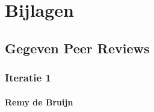 \documentclass[a4paper]{report}
\begin{document}


\endgroup

\chapter{Bijlagen}
\section{Gegeven Peer Reviews}
\subsection{Iteratie 1}
\subsubsection{Remy de Bruijn}
\noindent
\begin{minipage}{\textwidth}
  \centering
\end{minipage}
\end{document}
